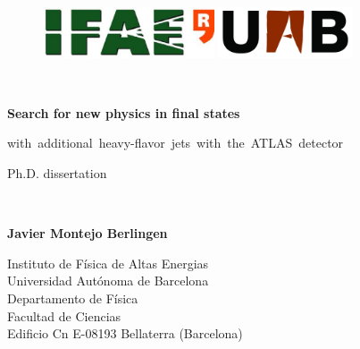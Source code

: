 \thispagestyle{empty}

\begin{titlepage}
\begin{center}

\begin{figure}[h!]
\includegraphics[height=15mm]{Title/IFAE_logo}
\hfill
\includegraphics[height=15mm]{Title/uab_logo}
\end{figure}

\vspace{0.5cm}
\HRule\\
\vspace{0.2cm}
{\huge \bf Search for new physics in \boldmath{$\ttbar$} final states 
\par
  \vspace{0.1in}
\Large with~additional~heavy-flavor~jets~with~the~ATLAS~detector
\par
  \vspace{0.5in}
\huge Ph.D. dissertation}
\vspace{0.1cm}
\HRule\\
\par
\vspace{1.3in}

{\LARGE \bf Javier Montejo Berlingen}
\vspace{0.3cm}
\par
Instituto de F\'{i}sica de Altas Energias\\
Universidad Aut\'{o}noma de Barcelona\\
Departamento de F\'{i}sica\\
Facultad de Ciencias \\
Edificio Cn E-08193 Bellaterra (Barcelona)
\par
\vspace{0.5in}


\end{center}
\end{titlepage}
